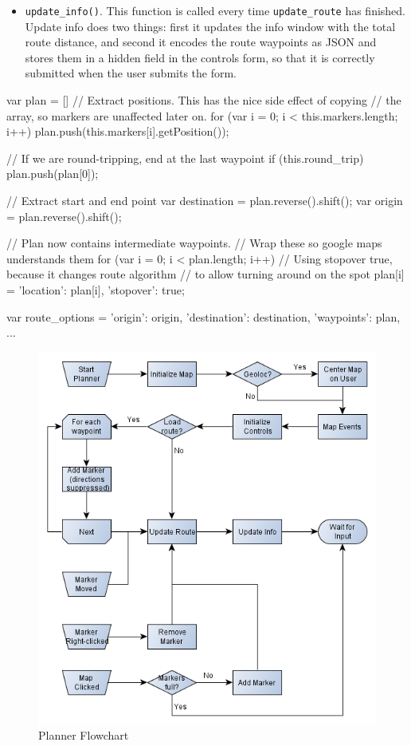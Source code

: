 \begin{itemize}
	\item{\texttt{update\_info()}. This function is called every time \texttt{update\_route} has finished. Update info does two things: first it updates the info window with the total route distance, and second it encodes the route waypoints as \ac{JSON} and stores them in a hidden field in the controls form, so that it is correctly submitted when the user submits the form.}
\end{itemize}

\begin{code}[label={lst:update-route-1}, caption={Converting a List of Waypoints for Directions}, language={JavaScript}]
var plan = []
// Extract positions. This has the nice side effect of copying  
// the array, so markers are unaffected later on.
for (var i = 0; i < this.markers.length; i++)
{
	plan.push(this.markers[i].getPosition());
}

// If we are round-tripping, end at the last waypoint
if (this.round_trip)
	plan.push(plan[0]);

// Extract start and end point
var destination = plan.reverse().shift();
var origin = plan.reverse().shift();

// Plan now contains intermediate waypoints. 
// Wrap these so google maps understands them
for (var i = 0; i < plan.length; i++)
{
	// Using stopover true, because it changes route algorithm 
	// to allow turning around on the spot
	plan[i] = {'location': plan[i], 'stopover': true};
}
		
var route_options = {'origin': origin,
					 'destination': destination,
					 'waypoints': plan,
					 ...}
\end{code}

\begin{figure}[!ht]
	\centering
	\includegraphics[width=\textwidth]{img/sprint1webflow.png}
	\caption{Planner Flowchart}
	\label{fig:sprint1-web-flow}
\end{figure}

